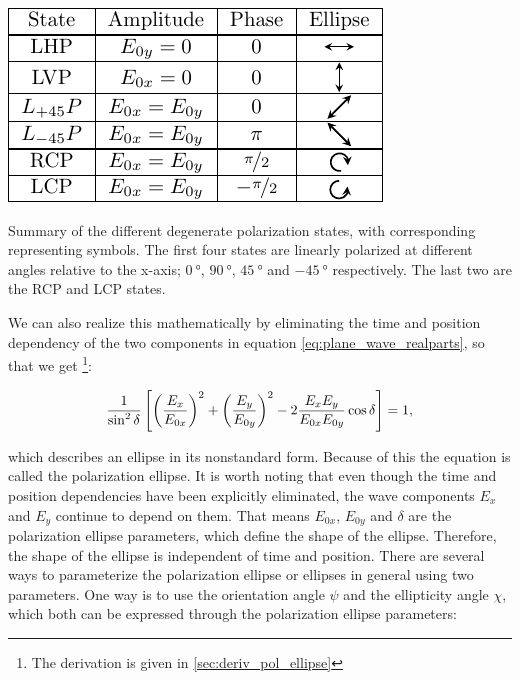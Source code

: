 \begin{table}[h]
    \centering
    \includegraphics[scale=1]{images/theory/pol_summary_table.pdf}
    \caption{Summary of the different degenerate polarization states, with corresponding representing symbols. The first four states are linearly polarized at different angles relative to the x-axis; $\SI{0}{\degree}$, $\SI{90}{\degree}$, $\SI{45}{\degree}$ and $\SI{-45}{\degree}$ respectively. The last two are the RCP and LCP states.}
    \label{tab:pol_state_summary}
\end{table}

We can also realize this mathematically by eliminating the time and position dependency of the two components in equation \ref{eq:plane_wave_realparts}, so that we get \footnote{The derivation is given in \ref{sec:deriv_pol_ellipse}}:

\begin{equation}
    \centering
    \label{eq:pol_ellipse}
    \frac{1}{\sin^2 \delta} \left[ \left(\frac{E_x}{E_{0x}}\right)^2+\left(\frac{E_y}{E_{0y}}\right)^2-2\frac{E_x E_y}{E_{0x} E_{0y}}\cos \delta \right]=1,
\end{equation}

which describes an ellipse in its nonstandard form. Because of this the equation is called the polarization ellipse. It is worth noting that even though the time and position dependencies have been explicitly eliminated, the wave components $E_x$ and $E_y$ continue to depend on them. That means $E_{0x}$, $E_{0y}$ and $\delta$ are the polarization ellipse parameters, which define the shape of the ellipse. Therefore, the shape of the ellipse is independent of time and position. There are several ways to parameterize the polarization ellipse or ellipses in general using two parameters. One way is to use the orientation angle $\psi$ and the ellipticity angle $\chi$, which both can be expressed through the polarization ellipse parameters: 

